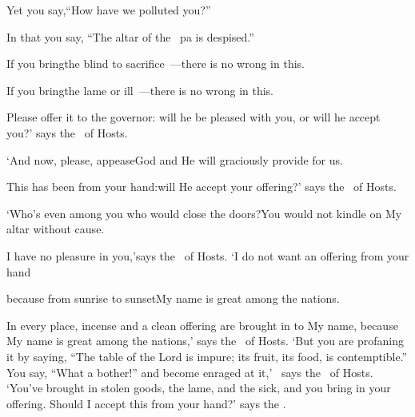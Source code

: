 \begin{inparaenum}
  \pc{}Yet you say,\pa{}``How have we polluted you?''%

  \pc{}In that you say,%
  ``The altar of the \lord\ pa is despised.''%

  \pb{} If you bring\pa{}the blind to sacrifice~---\pa{}there is no wrong in this.%

  \pc{}If you bring\pa{}the lame or ill~---\pa{}there is no wrong in this.%

  \pc{}Please offer it to the governor:%
  \pa{}will he be pleased with you, or will he accept you?'%
  \pa{}says the \lord\ of Hosts.%

  \pb{} `And now, please, appease\pa{}God and He will graciously provide for us.%

  \pc{}This has been from your hand:\pa{}will He accept your offering?'%
  \pa{}says the \lord\ of Hosts.%

  \pb{} `Who's even among you who would close the doors?\pa{}You would not kindle on My altar without cause.%

  \pc{}I have no pleasure in you,'\pa{}says the \lord\ of Hosts.%
  \pa{}`I do not want an offering from your hand%

  \pb{}%
  because from sunrise to sunset\pa{}My name is great among the nations.\smallskip%

  \noindent In every place, incense and a clean%
  offering are brought in to My name, because My name is great among the nations,' says the \lord\ of Hosts.%
   `But you are profaning it by saying, ``The table of the Lord is impure; its fruit, its food, is contemptible.''%
   You say, ``What a bother!'' and become enraged at it,'\
  says the \lord\ of Hosts. `You've brought in stolen goods, the lame, and the sick, and you bring in your offering. Should I accept this from your hand?' says the \lord.\


\end{inparaenum}
